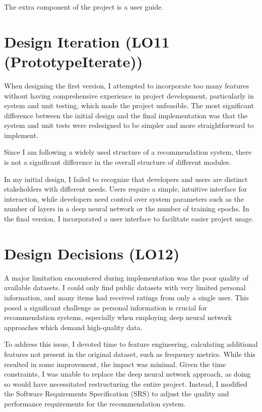 \documentclass{article}
\begin{document}
The extra component of the project is a user guide.

\section{Design Iteration (LO11 (PrototypeIterate))}

When designing the first version, I attempted to incorporate too many features without having comprehensive experience in project development, particularly in system and unit testing, which made the project unfeasible. The most significant difference between the initial design and the final implementation was that the system and unit tests were redesigned to be simpler and more straightforward to implement.

Since I am following a widely used structure of a recommendation system, there is not a significant difference in the overall structure of different modules.

In my initial design, I failed to recognize that developers and users are distinct stakeholders with different needs. Users require a simple, intuitive interface for interaction, while developers need control over system parameters such as the number of layers in a deep neural network or the number of training epochs. In the final version, I incorporated a user interface to facilitate easier project usage.

\section{Design Decisions (LO12)}

 A major limitation encountered during implementation was the poor quality of available datasets. I could only find public datasets with very limited personal information, and many items had received ratings from only a single user. This posed a significant challenge as personal information is crucial for recommendation systems, especially when employing deep neural network approaches which demand high-quality data.

To address this issue, I devoted time to feature engineering, calculating additional features not present in the original dataset, such as frequency metrics. While this resulted in some improvement, the impact was minimal. Given the time constraints, I was unable to replace the deep neural network approach, as doing so would have necessitated restructuring the entire project. Instead, I modified the Software Requirements Specification (SRS) to adjust the quality and performance requirements for the recommendation system.
\end{document}
